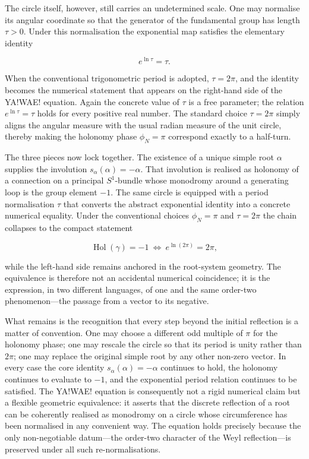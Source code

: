The circle itself, however, still carries an undetermined scale. One may normalise its angular coordinate so that the generator of the fundamental group has length \(\tau>0\). Under this normalisation the exponential map satisfies the elementary identity

\[
e^{\ln\tau}=\tau.
\]

When the conventional trigonometric period is adopted, \(\tau=2\pi\), and the identity becomes the numerical statement that appears on the right-hand side of the YA!WAE! equation. Again the concrete value of \(\tau\) is a free parameter; the relation \(e^{\ln\tau}=\tau\) holds for every positive real number. The standard choice \(\tau=2\pi\) simply aligns the angular measure with the usual radian measure of the unit circle, thereby making the holonomy phase \(\phi_N=\pi\) correspond exactly to a half-turn.

The three pieces now lock together. The existence of a unique simple root \(\alpha\) supplies the involution \(s_\alpha(\alpha)=-\alpha\). That involution is realised as holonomy of a connection on a principal \(S^1\)-bundle whose monodromy around a generating loop is the group element \(-1\). The same circle is equipped with a period normalisation \(\tau\) that converts the abstract exponential identity into a concrete numerical equality. Under the conventional choices \(\phi_N=\pi\) and \(\tau=2\pi\) the chain collapses to the compact statement

\[
\operatorname{Hol}(\gamma)=-1\ \Longleftrightarrow\ e^{\ln(2\pi)}=2\pi,
\]

while the left-hand side remains anchored in the root-system geometry. The equivalence is therefore not an accidental numerical coincidence; it is the expression, in two different languages, of one and the same order-two phenomenon—the passage from a vector to its negative.

What remains is the recognition that every step beyond the initial reflection is a matter of convention. One may choose a different odd multiple of \(\pi\) for the holonomy phase; one may rescale the circle so that its period is unity rather than \(2\pi\); one may replace the original simple root by any other non-zero vector. In every case the core identity \(s_\alpha(\alpha)=-\alpha\) continues to hold, the holonomy continues to evaluate to \(-1\), and the exponential period relation continues to be satisfied. The YA!WAE! equation is consequently not a rigid numerical claim but a flexible geometric equivalence: it asserts that the discrete reflection of a root can be coherently realised as monodromy on a circle whose circumference has been normalised in any convenient way. The equation holds precisely because the only non-negotiable datum—the order-two character of the Weyl reflection—is preserved under all such re-normalisations.

